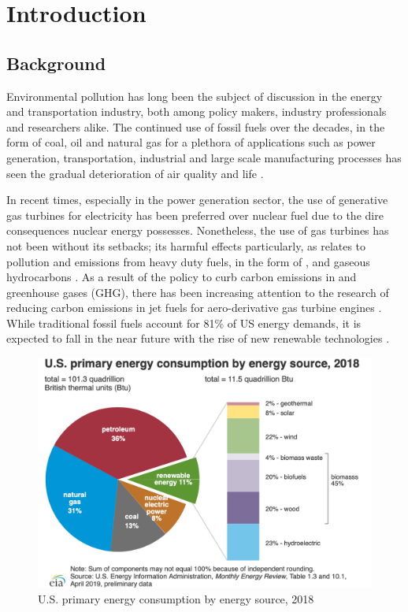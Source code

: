 \chapter{Introduction}
\section{Background}
Environmental pollution has long been the subject of discussion in the energy and transportation industry, both among policy makers, industry professionals and researchers alike. The continued use of fossil fuels over the decades, in the form of coal, oil and natural gas for a plethora of applications such as power generation, transportation, industrial and large scale manufacturing processes has seen the gradual deterioration of air quality and life \cite{EnergyInformationAdministration2018U.S.2017}.

In recent times, especially in the power generation sector, the use of generative gas turbines for electricity has been preferred over nuclear fuel due to the dire consequences nuclear energy possesses. Nonetheless, the use of gas turbines has not been without its setbacks; its harmful effects particularly, as relates to pollution and emissions from heavy duty fuels, in the form of ,  and gaseous hydrocarbons \cite{Timko2010ParticulateFuel}. As a result of the policy to curb carbon emissions in and greenhouse gases (GHG), there has been increasing attention to the research of reducing carbon emissions in jet fuels for aero-derivative gas turbine engines \cite{Timko2010ParticulateFuel}. While traditional fossil fuels account for 81\% of US energy demands, it is expected to fall in the near future with the rise of new renewable technologies \cite{EnergyInformationAdministration2018U.S.2017}. 

\begin{figure}[ht]
    \centering
    \includegraphics[width=\textwidth, height=\textheight, keepaspectratio]{images/chart-2.png}
    \caption{U.S. primary energy consumption by energy source, 2018 \cite{EnergyInformationAdministration2019Monthly2019}}
    \label{fig:energy demand}
\end{figure}


